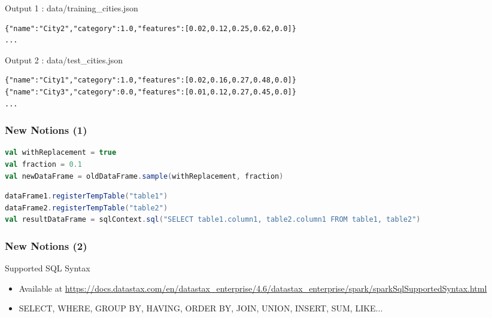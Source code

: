 \documentclass[slidetop,9pt,utf8]{beamer}
\begin{document}
\begin{CJK}{UTF8}{gbsn}
\begin{frame}[fragile]
  \begin{block}{Output 1 : data/training\_cities.json}
    \begin{verbatim}
{"name":"City2","category":1.0,"features":[0.02,0.12,0.25,0.62,0.0]}
...
    \end{verbatim}
  \end{block}

  \begin{block}{Output 2 : data/test\_cities.json}
    \begin{verbatim}
{"name":"City1","category":1.0,"features":[0.02,0.16,0.27,0.48,0.0]}
{"name":"City3","category":0.0,"features":[0.01,0.12,0.27,0.45,0.0]}
...
    \end{verbatim}
  \end{block}

\end{frame}

\begin{frame}[fragile]
  \frametitle{New Notions (1)}

  \begin{lstlisting}[label=Sampling, caption=Sampling, language=scala, style=code]
val withReplacement = true
val fraction = 0.1
val newDataFrame = oldDataFrame.sample(withReplacement, fraction)
  \end{lstlisting}

  \begin{lstlisting}[label=SQLRequestOnTemporaryTables, caption=SQL Requests on Temporary Tables, language=scala, style=code]
dataFrame1.registerTempTable("table1")
dataFrame2.registerTempTable("table2")
val resultDataFrame = sqlContext.sql("SELECT table1.column1, table2.column1 FROM table1, table2")
  \end{lstlisting}

\end{frame}

\begin{frame}[fragile]
  \frametitle{New Notions (2)}

  \begin{block}{Supported SQL Syntax}
    \begin{itemize}
      \item Available at \tiny\href{http://docs.datastax.com/en/datastax\_enterprise/4.6/datastax\_enterprise/spark/sparkSqlSupportedSyntax.html}{https://docs.datastax.com/en/datastax\_enterprise/4.6/datastax\_enterprise/spark/sparkSqlSupportedSyntax.html}\normalsize
      \item SELECT, WHERE, GROUP BY, HAVING, ORDER BY, JOIN, UNION, INSERT, SUM, LIKE...
    \end{itemize}
  \end{block}


\end{frame}
\end{CJK}
\end{document}
